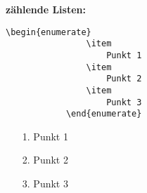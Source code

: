 \documentclass["WS\space 16-17\space -\space LaTeX-Kurs\space -\space Praesentation\space -\space 2.tex"]{subfiles}
\begin{document}
\begin{frame}[fragile]
    \textbf{\large{zählende Listen:}}\newline
    \Code*
        \begin{lstlisting}[gobble=12]
            \begin{enumerate}
                \item
                    Punkt 1
                \item
                    Punkt 2
                \item
                    Punkt 3
            \end{enumerate}
        \end{lstlisting}
    \Ausgabe
        \begin{outputbox}
            \begin{enumerate}
                \item[1.]
                    Punkt 1
                \item[2.]
                    Punkt 2
                \item[3.]
                    Punkt 3
            \end{enumerate}
        \end{outputbox}
\end{frame}
\end{document}
